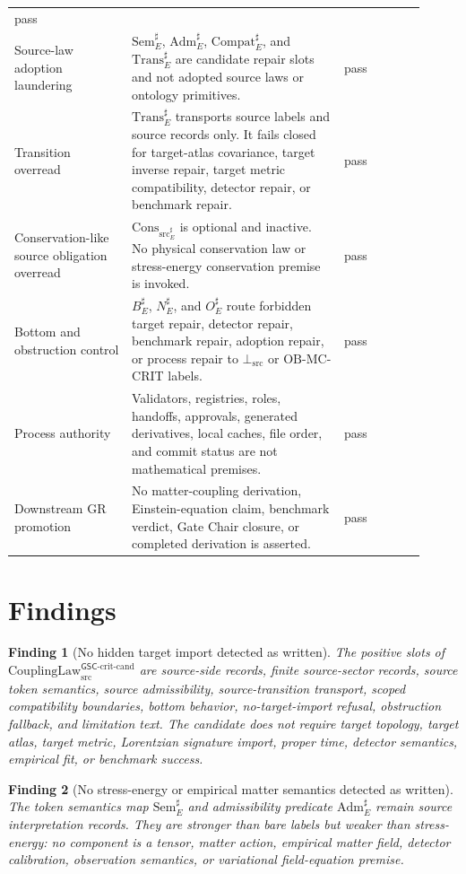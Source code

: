 \documentclass[11pt]{article}
\newcommand{\CouplingLawCrit}{\mathrm{CouplingLaw}^{\mathsf{GSC}\mbox{-}\mathrm{crit}\mbox{-}\mathrm{cand}}_{\mathrm{src}}}
\newcommand{\BottomSrc}{\bot_{\mathrm{src}}}
\newcommand{\Sem}{\mathrm{Sem}}
\newcommand{\Adm}{\mathrm{Adm}}
\newcommand{\Trans}{\mathrm{Trans}}
\newcommand{\Compat}{\mathrm{Compat}}
\newcommand{\ConsSrc}{\mathrm{Cons}_{\mathrm{src}}}
\newcommand{\OBMC}{\mathrm{OB}\mbox{-}\mathrm{MC}}
\newtheorem{finding}{Finding}
\begin{document}
\begin{longtable}{p{0.26\linewidth}p{0.47\linewidth}p{0.18\linewidth}}
pass \\
\addlinespace
Source-law adoption laundering &
\(\Sem_E^{\sharp}\), \(\Adm_E^{\sharp}\), \(\Compat_E^{\sharp}\), and
\(\Trans_E^{\sharp}\) are candidate repair slots and not adopted source laws
or ontology primitives. & pass \\
\addlinespace
Transition overread &
\(\Trans_E^{\sharp}\) transports source labels and source records only. It
fails closed for target-atlas covariance, target inverse repair, target metric
compatibility, detector repair, or benchmark repair. & pass \\
\addlinespace
Conservation-like source obligation overread &
\(\ConsSrc_E^{\sharp}\) is optional and inactive. No physical conservation
law or stress-energy conservation premise is invoked. & pass \\
\addlinespace
Bottom and obstruction control &
\(B_E^{\sharp}\), \(N_E^{\sharp}\), and \(O_E^{\sharp}\) route forbidden
target repair, detector repair, benchmark repair, adoption repair, or process
repair to \(\BottomSrc\) or \(\OBMC\)-CRIT labels. & pass \\
\addlinespace
Process authority &
Validators, registries, roles, handoffs, approvals, generated derivatives,
local caches, file order, and commit status are not mathematical premises. &
pass \\
\addlinespace
Downstream GR promotion &
No matter-coupling derivation, Einstein-equation claim, benchmark verdict,
Gate Chair closure, or completed derivation is asserted. & pass \\
\bottomrule
\end{longtable}

\section{Findings}

\begin{finding}[No hidden target import detected as written]
The positive slots of \(\CouplingLawCrit\) are source-side records, finite
source-sector records, source token semantics, source admissibility,
source-transition transport, scoped compatibility boundaries, bottom behavior,
no-target-import refusal, obstruction fallback, and limitation text. The
candidate does not require target topology, target atlas, target metric,
Lorentzian signature import, proper time, detector semantics, empirical fit,
or benchmark success.
\end{finding}

\begin{finding}[No stress-energy or empirical matter semantics detected as written]
The token semantics map \(\Sem_E^{\sharp}\) and admissibility predicate
\(\Adm_E^{\sharp}\) remain source interpretation records. They are stronger
than bare labels but weaker than stress-energy: no component is a tensor,
matter action, empirical matter field, detector calibration, observation
semantics, or variational field-equation premise.
\end{finding}
\end{document}
